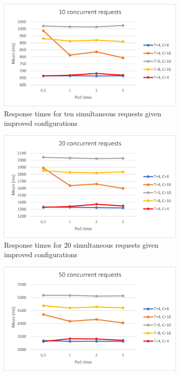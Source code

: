 \begin{figure}
    \centering
    \begin{subfigure}[b]{0.45\textwidth}
        \centering
        \includegraphics[width=\textwidth]{images/10v3.png}
        \caption{Response times for ten simultaneous requests given improved configurations}
        \label{fig:10v3}
    \end{subfigure}
    \hfill
    \begin{subfigure}[b]{0.45\textwidth}
        \centering
        \includegraphics[width=\textwidth]{images/20v3.png}
        \caption{Response times for 20 simultaneous requests given improved configurations}
        \label{fig:20v3}
    \end{subfigure}
    \hfill
    \begin{subfigure}[b]{0.45\textwidth}
        \centering
        \includegraphics[width=\textwidth]{images/50v3.png}

\end{subfigure}
\end{figure}
